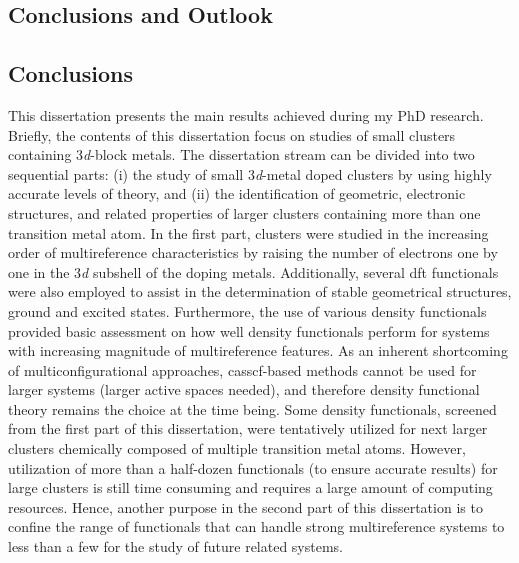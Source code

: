 
\begin{refsection}


\chapter{Conclusions and Outlook}\label{conclusion}

\section{Conclusions}

This dissertation presents the main results achieved during my PhD research. Briefly, the contents of this dissertation focus on studies of small clusters containing 3\textit{d}-block metals. The dissertation stream can be divided into two sequential parts: (i) the study of small 3\textit{d}-metal doped clusters by using highly accurate levels of theory, and (ii) the identification of geometric, electronic structures, and related properties of larger clusters containing more than one transition metal atom. In the first part, clusters were studied in the increasing order of multireference characteristics by raising the number of electrons one by one in the 3\textit{d} subshell of the doping metals. Additionally, several \acrshort{dft} functionals were also employed to assist in the determination of stable geometrical structures, ground and excited states. Furthermore, the use of various density functionals provided basic assessment on how well density functionals perform for systems with increasing magnitude of multireference features. As an inherent shortcoming of multiconfigurational approaches, \acrshort{casscf}-based methods cannot be used for larger systems (larger active spaces needed), and therefore density functional theory remains the choice at the time being. Some density functionals, screened from the first part of this dissertation, were tentatively utilized for next larger clusters chemically composed of multiple transition metal atoms. However, utilization of  more than a half-dozen functionals (to ensure accurate results) for large clusters is still time consuming and requires a large amount of computing resources. Hence, another purpose in the second part of this dissertation is to confine the range of functionals that can handle strong multireference systems to less than a few for the study of future related systems.       




\end{refsection}
